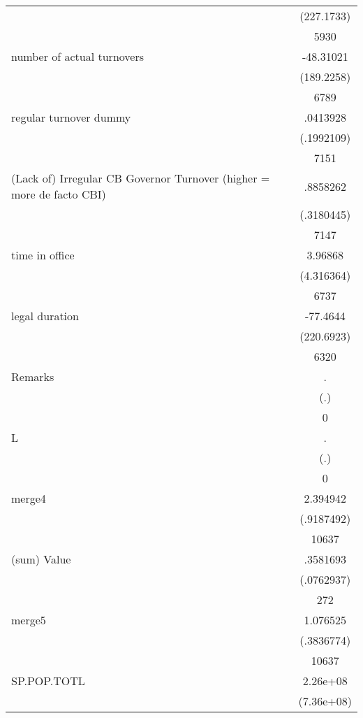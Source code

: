 {\begin{tabular}{l*{1}{c}}
                    &  (227.1733)\\
                    &        5930\\
number of actual turnovers&   -48.31021\\
                    &  (189.2258)\\
                    &        6789\\
regular turnover dummy&    .0413928\\
                    &  (.1992109)\\
                    &        7151\\
(Lack of) Irregular CB Governor Turnover (higher = more de facto CBI)&    .8858262\\
                    &  (.3180445)\\
                    &        7147\\
time in office      &     3.96868\\
                    &  (4.316364)\\
                    &        6737\\
legal duration      &    -77.4644\\
                    &  (220.6923)\\
                    &        6320\\
Remarks             &           .\\
                    &         (.)\\
                    &           0\\
L                   &           .\\
                    &         (.)\\
                    &           0\\
merge4              &    2.394942\\
                    &  (.9187492)\\
                    &       10637\\
(sum) Value         &    .3581693\\
                    &  (.0762937)\\
                    &         272\\
merge5              &    1.076525\\
                    &  (.3836774)\\
                    &       10637\\
SP.POP.TOTL         &    2.26e+08\\
                    &  (7.36e+08)\\

\end{tabular}}
